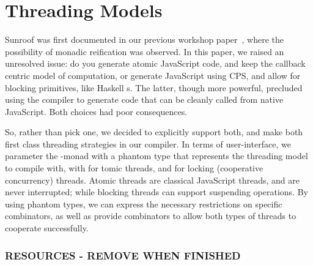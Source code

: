  
\section{Threading Models}
\label{sec:threading-models}

Sunroof was first documented in our previous 
workshop paper~\cite{Farmer:12:WebDSLs},
where the possibility of monadic reification was observed.
In this paper, we raised an unresolved issue: do you
generate atomic JavaScript code, and keep the callback
centric model of computation, or generate JavaScript
using CPS, and allow for blocking primitives,
like Haskell s. The latter, though more powerful, 
precluded using the compiler to generate
code that can be cleanly called from native JavaScript.
Both choices had poor consequences.

So, rather than pick one, we decided to explicitly support both,
and make both first class threading strategies in our compiler.
In terms of user-interface, we parameter the \JS-monad
with a phantom type that represents the threading model
to compile with, with  for tomic threads,
and  for locking (cooperative concurrency) threads. 
Atomic threads are classical JavaScript threads, and
are never interrupted; while blocking threads can
support suspending operations. By using phantom
types, we can express the necessary
restrictions on specific combinators, as well
as provide combinators to allow both types of
threads to cooperate successfully.

\subsubsection{RESOURCES - REMOVE WHEN FINISHED}


